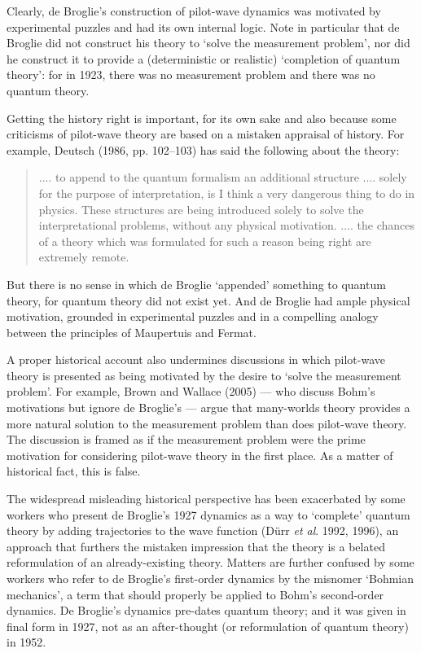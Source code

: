 \documentclass{article}%
\begin{document}
Clearly, de Broglie's construction of pilot-wave dynamics was motivated by
experimental puzzles and had its own internal logic. Note in particular that
de Broglie did not construct his theory to `solve the measurement problem',
nor did he construct it to provide a (deterministic or realistic) `completion
of quantum theory': for in 1923, there was no measurement problem and there
was no quantum theory.

Getting the history right is important, for its own sake and also because some
criticisms of pilot-wave theory are based on a mistaken appraisal of history.
For example, Deutsch (1986, pp. 102--103) has said the following about the theory:

\begin{quote}
.... to append to the quantum formalism an additional structure .... solely
for the purpose of interpretation, is I think a very dangerous thing to do in
physics. These structures are being introduced solely to solve the
interpretational problems, without any physical motivation. .... the chances
of a theory which was formulated for such a reason being right are extremely remote.
\end{quote}
But there is no sense in which de Broglie `appended' something to
quantum theory, for quantum theory did not exist yet. And de Broglie had ample
physical motivation, grounded in experimental puzzles and in a compelling
analogy between the principles of Maupertuis and Fermat.

A proper historical account also undermines discussions in which pilot-wave
theory is presented as being motivated by the desire to `solve the measurement
problem'. For example, Brown and Wallace (2005) --- who discuss Bohm's
motivations but ignore de Broglie's --- argue that many-worlds theory provides
a more natural solution to the measurement problem than does pilot-wave
theory. The discussion is framed as if the measurement problem were the prime
motivation for considering pilot-wave theory in the first place. As a matter
of historical fact, this is false.

The widespread misleading historical perspective has been exacerbated by some
workers who present de Broglie's 1927 dynamics as a way to `complete' quantum
theory by adding trajectories to the wave function (D\"{u}rr \textit{et al}.
1992, 1996), an approach that furthers the mistaken impression that the theory
is a belated reformulation of an already-existing theory. Matters are further
confused by some workers who refer to de Broglie's first-order dynamics by the
misnomer `Bohmian mechanics', a term that should properly be applied to Bohm's
second-order dynamics. De Broglie's dynamics pre-dates quantum theory; and it
was given in final form in 1927, not as an after-thought (or reformulation of
quantum theory) in 1952.
\end{document}
